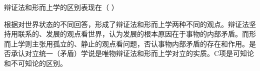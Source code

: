 \question 辩证法和形而上学的区别表现在（ ）
\par{}
\begin{solution}根据对世界状态的不同回答，形成了辩证法和形而上学两种不同的观点。辩证法坚持用联系的、发展的观点看世界，认为发展的根本原因在于事物的内部矛盾。而形而上学则主张用孤立的、静止的观点看问题，否认事物内部矛盾的存在和作用。是否承认对立统一（矛盾）学说是唯物辩证法和形而上学对立的实质。C项是可知论和不可知论的区别。
\end{solution}
